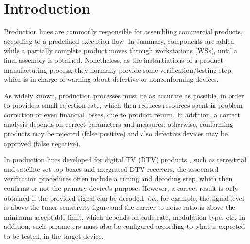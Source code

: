 \documentclass[conference]{IEEEtran}
\begin{document}




%
\IEEEpeerreviewmaketitle



\section{Introduction}
\label{intro}

Production lines are commonly responsible for assembling commercial products, according to a predefined execution flow. In summary, components are added while a partially complete product moves through workstations (WSs), until a final assembly is obtained. Nonetheless, as the instantiations of a product manufacturing process, they normally provide some verification/testing step, which is in charge of warning about defective or nonconforming devices.

As widely known, production processes must be as accurate as possible, in order to provide a small rejection rate, which then reduces resources spent in problem correction or even financial losses, due to product return. In addition, a correct analysis depends on correct parameters and measures; otherwise, conforming products may be rejected (false positive) and also defective devices may be approved (false negative).

In production lines developed for digital TV (DTV) products \cite{keith}, such as terrestrial and satellite set-top boxes and integrated DTV receivers, the associated verification procedures often include a tuning and decoding step, which then confirms or not the primary device's purpose. However, a correct result is only obtained if the provided signal can be decoded, {\it i.e.}, for example, the signal level is above the tuner sensitivity figure and the carrier-to-noise ratio is above the minimum acceptable limit, which depends on code rate, modulation type, etc. In addition, such parameters must also be configured according to what is expected to be tested, in the target device.%
\end{document}
